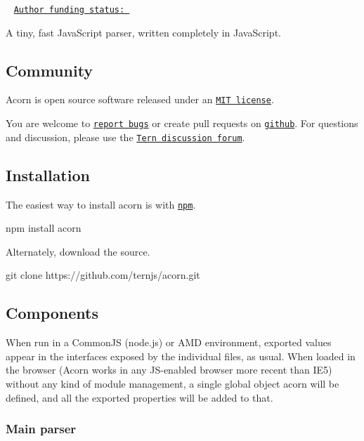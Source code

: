 \href{https://travis-ci.org/ternjs/acorn}{\tt } \href{https://www.npmjs.com/package/acorn}{\tt } ~\newline
\href{https://marijnhaverbeke.nl/fund/}{\tt Author funding status\+: }

A tiny, fast Java\+Script parser, written completely in Java\+Script.

\subsection*{Community}

Acorn is open source software released under an \href{https://github.com/ternjs/acorn/blob/master/LICENSE}{\tt M\+IT license}.

You are welcome to \href{https://github.com/ternjs/acorn/issues}{\tt report bugs} or create pull requests on \href{https://github.com/ternjs/acorn}{\tt github}. For questions and discussion, please use the \href{https://discuss.ternjs.net}{\tt Tern discussion forum}.

\subsection*{Installation}

The easiest way to install acorn is with \href{https://www.npmjs.com/}{\tt {\ttfamily npm}}.


\begin{DoxyCode}
npm install acorn
\end{DoxyCode}


Alternately, download the source.


\begin{DoxyCode}
git clone https://github.com/ternjs/acorn.git
\end{DoxyCode}


\subsection*{Components}

When run in a Common\+JS (node.\+js) or A\+MD environment, exported values appear in the interfaces exposed by the individual files, as usual. When loaded in the browser (Acorn works in any J\+S-\/enabled browser more recent than I\+E5) without any kind of module management, a single global object {\ttfamily acorn} will be defined, and all the exported properties will be added to that.

\subsubsection*{Main parser}

